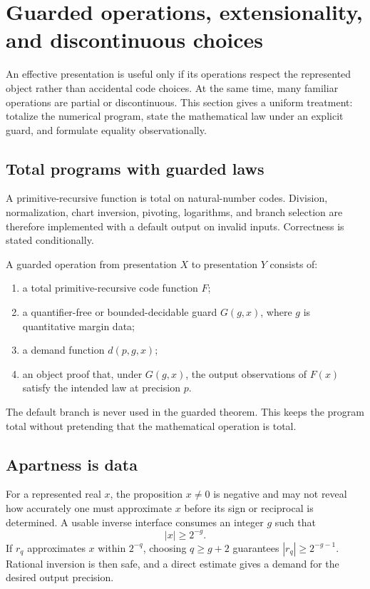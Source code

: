 \section{Guarded operations, extensionality, and discontinuous choices}
\label{sec:guarded}

An effective presentation is useful only if its operations respect the represented object rather than accidental code choices.  At the same time, many familiar operations are partial or discontinuous.  This section gives a uniform treatment: totalize the numerical program, state the mathematical law under an explicit guard, and formulate equality observationally.

\subsection{Total programs with guarded laws}

A primitive-recursive function is total on natural-number codes.  Division, normalization, chart inversion, pivoting, logarithms, and branch selection are therefore implemented with a default output on invalid inputs.  Correctness is stated conditionally.

\begin{definition}
A guarded operation from presentation \(X\) to presentation \(Y\) consists of:

\begin{enumerate}
\item a total primitive-recursive code function \(F\);
\item a quantifier-free or bounded-decidable guard \(G(g,x)\), where \(g\) is quantitative margin data;
\item a demand function \(d(p,g,x)\);
\item an object proof that, under \(G(g,x)\), the output observations of \(F(x)\) satisfy the intended law at precision \(p\).
\end{enumerate}
\end{definition}

The default branch is never used in the guarded theorem.  This keeps the program total without pretending that the mathematical operation is total.

\subsection{Apartness is data}

For a represented real \(x\), the proposition \(x\neq0\) is negative and may not reveal how accurately one must approximate \(x\) before its sign or reciprocal is determined.  A usable inverse interface consumes an integer \(g\) such that
\[
 |x|\ge 2^{-g}.
\]
If \(r_q\) approximates \(x\) within \(2^{-q}\), choosing \(q\ge g+2\) guarantees \(|r_q|\ge 2^{-g-1}\).  Rational inversion is then safe, and a direct estimate gives a demand for the desired output precision.

